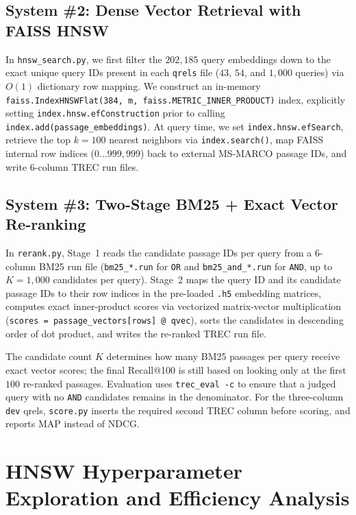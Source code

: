 \documentclass[11pt]{article}
\begin{document}
\subsection{System \#2: Dense Vector Retrieval with FAISS HNSW}
In \texttt{hnsw\_search.py}, we first filter the $202{,}185$ query embeddings down to the exact unique query IDs present in each \texttt{qrels} file ($43$, $54$, and $1{,}000$ queries) via $O(1)$ dictionary row mapping. We construct an in-memory \texttt{faiss.IndexHNSWFlat(384, m, faiss.METRIC\_INNER\_PRODUCT)} index, explicitly setting \texttt{index.hnsw.efConstruction} prior to calling \texttt{index.add(passage\_embeddings)}. At query time, we set \texttt{index.hnsw.efSearch}, retrieve the top $k=100$ nearest neighbors via \texttt{index.search()}, map FAISS internal row indices ($0 \dots 999{,}999$) back to external MS-MARCO passage IDs, and write 6-column TREC run files.

\subsection{System \#3: Two-Stage BM25 + Exact Vector Re-ranking}
In \texttt{rerank.py}, Stage~1 reads the candidate passage IDs per query from a 6-column BM25 run file (\texttt{bm25\_*.run} for \texttt{OR} and \texttt{bm25\_and\_*.run} for \texttt{AND}, up to $K=1{,}000$ candidates per query). Stage~2 maps the query ID and its candidate passage IDs to their row indices in the pre-loaded \texttt{.h5} embedding matrices, computes exact inner-product scores via vectorized matrix-vector multiplication (\texttt{scores = passage\_vectors[rows] @ qvec}), sorts the candidates in descending order of dot product, and writes the re-ranked TREC run file.

The candidate count $K$ determines how many BM25 passages per query receive exact vector scores; the final Recall@100 is still based on looking only at the first $100$ re-ranked passages. Evaluation uses \texttt{trec\_eval -c} to ensure that a judged query with no \texttt{AND} candidates remains in the denominator. For the three-column \texttt{dev} qrels, \texttt{score.py} inserts the required second TREC column before scoring, and reports MAP instead of NDCG.

\section{HNSW Hyperparameter Exploration and Efficiency Analysis}
\end{document}
